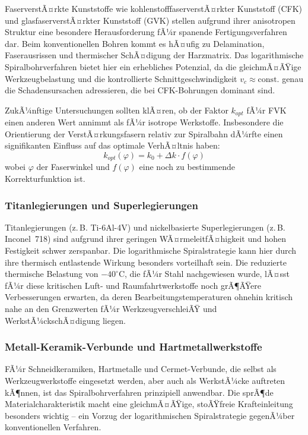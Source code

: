 ﻿\documentclass[12pt,a4paper]{article}
\begin{document}
FaserverstÃ¤rkte Kunststoffe wie kohlenstofffaserverstÃ¤rkter Kunststoff (CFK) und glasfaserverstÃ¤rkter Kunststoff (GVK) stellen aufgrund ihrer anisotropen Struktur eine besondere Herausforderung fÃ¼r spanende Fertigungsverfahren dar. Beim konventionellen Bohren kommt es hÃ¤ufig zu Delamination, Faserausrissen und thermischer SchÃ¤digung der Harzmatrix. Das logarithmische Spiralbohrverfahren bietet hier ein erhebliches Potenzial, da die gleichmÃ¤ÃŸige Werkzeugbelastung und die kontrollierte Schnittgeschwindigkeit $v_c \approx \text{const.}$ genau die Schadensursachen adressieren, die bei CFK-Bohrungen dominant sind.

ZukÃ¼nftige Untersuchungen sollten klÃ¤ren, ob der Faktor $k_{opt}$ fÃ¼r FVK einen anderen Wert annimmt als fÃ¼r isotrope Werkstoffe. Insbesondere die Orientierung der VerstÃ¤rkungsfasern relativ zur Spiralbahn dÃ¼rfte einen signifikanten Einfluss auf das optimale VerhÃ¤ltnis haben:
\begin{equation}
    k_{opt}(\varphi) = k_0 + \Delta k \cdot f(\varphi)
\end{equation}
wobei $\varphi$ der Faserwinkel und $f(\varphi)$ eine noch zu bestimmende Korrekturfunktion ist.

\subsubsection{Titanlegierungen und Superlegierungen}

Titanlegierungen (z.\,B. Ti-6Al-4V) und nickelbasierte Superlegierungen (z.\,B. Inconel~718) sind aufgrund ihrer geringen WÃ¤rmeleitfÃ¤higkeit und hohen Festigkeit schwer zerspanbar. Die logarithmische Spiralstrategie kann hier durch ihre thermisch entlastende Wirkung besonders vorteilhaft sein. Die reduzierte thermische Belastung von $-40^\circ\text{C}$, die fÃ¼r Stahl nachgewiesen wurde, lÃ¤sst fÃ¼r diese kritischen Luft- und Raumfahrtwerkstoffe noch grÃ¶ÃŸere Verbesserungen erwarten, da deren Bearbeitungstemperaturen ohnehin kritisch nahe an den Grenzwerten fÃ¼r WerkzeugverschleiÃŸ und WerkstÃ¼ckschÃ¤digung liegen.

\subsubsection{Metall-Keramik-Verbunde und Hartmetallwerkstoffe}

FÃ¼r Schneidkeramiken, Hartmetalle und Cermet-Verbunde, die selbst als Werkzeugwerkstoffe eingesetzt werden, aber auch als WerkstÃ¼cke auftreten kÃ¶nnen, ist das Spiralbohrverfahren prinzipiell anwendbar. Die sprÃ¶de Materialcharakteristik macht eine gleichmÃ¤ÃŸige, stoÃŸfreie Krafteinleitung besonders wichtig -- ein Vorzug der logarithmischen Spiralstrategie gegenÃ¼ber konventionellen Verfahren.
\end{document}
